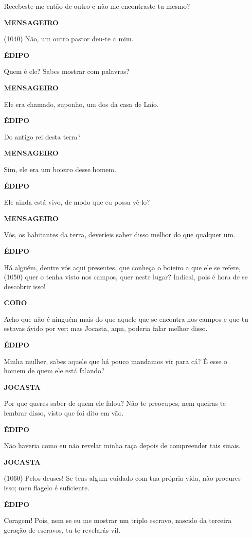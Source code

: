 Recebeste-me então de outro e não me encontraste tu mesmo?

\textbf{MENSAGEIRO}

(1040) Não, um outro pastor deu-te a mim.

\textbf{ÉDIPO}

Quem é ele? Sabes mostrar com palavras?

\textbf{MENSAGEIRO}

Ele era chamado, suponho, um dos da casa de Laio.

\textbf{ÉDIPO}

Do antigo rei desta terra?

\textbf{MENSAGEIRO}

Sim, ele era um boieiro desse homem.

\textbf{ÉDIPO}

Ele ainda está vivo, de modo que eu possa vê-lo?

\textbf{MENSAGEIRO}

Vós, os habitantes da terra, deveríeis saber disso melhor do que
qualquer um.

\textbf{ÉDIPO}

Há alguém, dentre vós aqui presentes, que conheça o boieiro a que ele se
refere, (1050) quer o tenha visto nos campos, quer neste lugar? Indicai,
pois é hora de se descobrir isso!

\textbf{CORO}

Acho que não é ninguém mais do que aquele que se encontra nos campos e
que tu estavas ávido por ver; mas Jocasta, aqui, poderia falar melhor
disso.

\textbf{ÉDIPO}

Minha mulher, sabes aquele que há pouco mandamos vir para cá? É esse o
homem de quem ele está falando?

\textbf{JOCASTA}

Por que queres saber de quem ele falou? Não te preocupes, nem queiras te
lembrar disso, visto que foi dito em vão.

\textbf{ÉDIPO}

Não haveria como eu não revelar minha raça depois de compreender tais
sinais.

\textbf{JOCASTA}

(1060) Pelos deuses! Se tens algum cuidado com tua própria vida, não
procures isso; meu flagelo é suficiente.

\textbf{ÉDIPO}

Coragem! Pois, nem se eu me mostrar um triplo escravo, nascido da
terceira geração de escravos, tu te revelarás vil.

